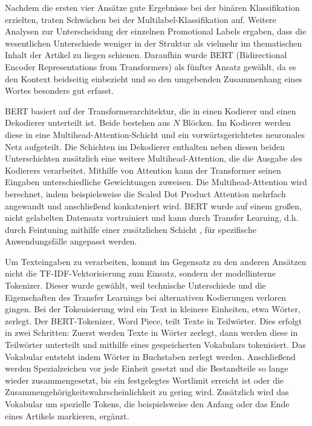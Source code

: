 Nachdem die ersten vier Ansätze gute Ergebnisse bei der binären Klassifikation erzielten, traten Schwächen bei der Multilabel-Klassifikation auf. Weitere Analysen zur Unterscheidung der einzelnen Promotional Labels ergaben, dass die wesentlichen Unterschiede weniger in der Struktur als vielmehr im thematischen Inhalt der Artikel zu liegen schienen. Daraufhin wurde BERT (Bidirectional Encoder Representations from Transformers) als fünfter Ansatz gewählt, da es den Kontext beidseitig einbezieht und so den umgebenden Zusammenhang eines Wortes besonders gut erfasst.

BERT basiert auf der Transformerarchitektur, die in einen Kodierer und einen Dekodierer unterteilt ist. Beide bestehen aus $N$ Blöcken. Im Kodierer werden diese in eine Multihead-Attention-Schicht und ein vorwärtsgerichtetes neuronales Netz aufgeteilt. Die Schichten im Dekodierer enthalten neben diesen beiden Unterschichten zusätzlich eine weitere Multihead-Attention, die die Ausgabe des Kodierers verarbeitet. Mithilfe von Attention kann der Transformer seinen Eingaben unterschiedliche Gewichtungen zuweisen. Die Multihead-Attention wird berechnet, indem beispielsweise die Scaled Dot Product Attention \cite{Vaswani2017} mehrfach angewandt und anschließend konkateniert wird. BERT wurde auf einem großen, nicht gelabelten Datensatz vortrainiert und kann durch Transfer Learning, d.h. durch Feintuning mithilfe einer zusätzlichen Schicht \cite{Devlin2018}, für spezifische Anwendungsfälle angepasst werden.

Um Texteingaben zu verarbeiten, kommt im Gegensatz zu den anderen Ansätzen nicht die TF-IDF-Vektorisierung zum Einsatz, sondern der modellinterne Tokenizer. Dieser wurde gewählt, weil technische Unterschiede und die Eigenschaften des Transfer Learnings bei alternativen Kodierungen verloren gingen. Bei der Tokenisierung wird ein Text in kleinere Einheiten, etwa Wörter, zerlegt. Der BERT-Tokenizer, Word Piece, teilt Texte in Teilwörter. Dies erfolgt in zwei Schritten: Zuerst werden Texte in Wörter zerlegt, dann werden diese in Teilwörter unterteilt und mithilfe eines gespeicherten Vokabulars tokenisiert. Das Vokabular entsteht indem Wörter in Buchstaben zerlegt werden. Anschließend werden Spezialzeichen vor jede Einheit gesetzt und die Bestandteile so lange wieder zusammengesetzt, bis ein festgelegtes Wortlimit erreicht ist oder die Zusammengehörigkeitswahrscheinlichkeit zu gering wird. Zusätzlich wird das Vokabular um spezielle Tokens, die beispielsweise den Anfang oder das Ende eines Artikels markieren, ergänzt.

